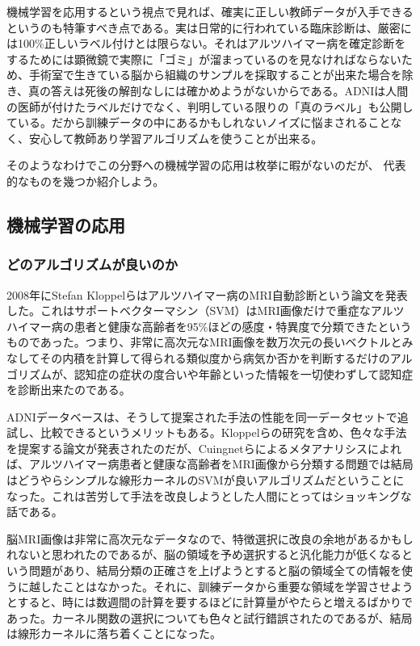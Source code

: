機械学習を応用するという視点で見れば、確実に正しい教師データが入手できるというのも特筆すべき点である。実は日常的に行われている臨床診断は、厳密には100\%正しいラベル付けとは限らない。それはアルツハイマー病を確定診断をするためには顕微鏡で実際に「ゴミ」が溜まっているのを見なければならないため、手術室で生きている脳から組織のサンプルを採取することが出来た場合を除き、真の答えは死後の解剖なしには確かめようがないからである。ADNIは人間の医師が付けたラベルだけでなく、判明している限りの「真のラベル」も公開している。だから訓練データの中にあるかもしれないノイズに悩まされることなく、安心して教師あり学習アルゴリズムを使うことが出来る。

そのようなわけでこの分野への機械学習の応用は枚挙に暇がないのだが、
代表的なものを幾つか紹介しよう。
\subsection{機械学習の応用}

\subsubsection{どのアルゴリズムが良いのか}
2008年にStefan Kloppelらはアルツハイマー病のMRI自動診断という論文を発表した。これはサポートベクターマシン（SVM）はMRI画像だけで重症なアルツハイマー病の患者と健康な高齢者を95\%ほどの感度・特異度で分類できたというものであった。つまり、非常に高次元なMRI画像を数万次元の長いベクトルとみなしてその内積を計算して得られる類似度から病気か否かを判断するだけのアルゴリズムが、認知症の症状の度合いや年齢といった情報を一切使わずして認知症を診断出来たのである。

ADNIデータベースは、そうして提案された手法の性能を同一データセットで追試し、比較できるというメリットもある。Kloppelらの研究を含め、色々な手法を提案する論文が発表されたのだが、Cuingnetらによるメタアナリシスによれば、アルツハイマー病患者と健康な高齢者をMRI画像から分類する問題では結局はどうやらシンプルな線形カーネルのSVMが良いアルゴリズムだということになった。これは苦労して手法を改良しようとした人間にとってはショッキングな話である。

脳MRI画像は非常に高次元なデータなので、特徴選択に改良の余地があるかもしれないと思われたのであるが、脳の領域を予め選択すると汎化能力が低くなるという問題があり、結局分類の正確さを上げようとすると脳の領域全ての情報を使うに越したことはなかった。それに、訓練データから重要な領域を学習させようとすると、時には数週間の計算を要するほどに計算量がやたらと増えるばかりであった。カーネル関数の選択についても色々と試行錯誤されたのであるが、結局は線形カーネルに落ち着くことになった。

